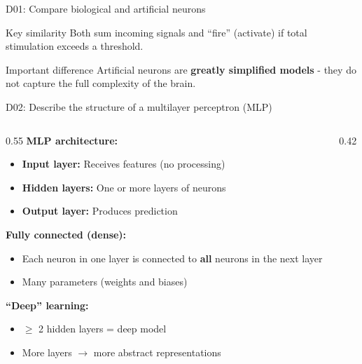 \documentclass[aspectratio=169, 10pt]{beamer}
\begin{document}
\begin{frame}{D01: Compare biological and artificial neurons}
    \vspace{0.5cm}
    \begin{block}{Key similarity}
        Both sum incoming signals and ``fire'' (activate) if total stimulation exceeds a threshold.
    \end{block}
    
    \begin{alertblock}{Important difference}
        Artificial neurons are \textbf{greatly simplified models} - they do not capture the full complexity of the brain.
    \end{alertblock}
\end{frame}

\begin{frame}{D02: Describe the structure of a multilayer perceptron (MLP)}
    \begin{columns}[T]
        \begin{column}{0.55\textwidth}
            \textbf{MLP architecture:}
            \begin{itemize}
                \item \textbf{Input layer:} Receives features (no processing)
                \item \textbf{Hidden layers:} One or more layers of neurons
                \item \textbf{Output layer:} Produces prediction
            \end{itemize}
            
            \vspace{0.3cm}
            \textbf{Fully connected (dense):}
            \begin{itemize}
                \item Each neuron in one layer is connected to \textbf{all} neurons in the next layer
                \item Many parameters (weights and biases)
            \end{itemize}
            
            \vspace{0.3cm}
            \textbf{``Deep'' learning:}
            \begin{itemize}
                \item $\geq$ 2 hidden layers = deep model
                \item More layers $\rightarrow$ more abstract representations
            \end{itemize}
        \end{column}
        \begin{column}{0.42\textwidth}
\end{column}
\end{columns}
\end{frame}
\end{document}
